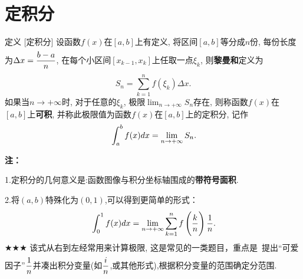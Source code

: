 \documentclass[a4paper,12pt,oneside,fontset=none]{ctexbook}
\let\olddfrac\dfrac
\renewcommand{\dfrac}[2]{
    \olddfrac{#1\vrule width 0pt height 1.15em depth 0em}{#2\vrule width 0pt height 0em depth 0.6em}
}
\let\oldlim\lim
\renewcommand{\lim}{\displaystyle\oldlim}
\let\oldint\int
\renewcommand{\int}{\displaystyle{\vrule width 0pt height 0em depth 0em}\oldint}
\let\oldsum\sum
\renewcommand{\sum}{\displaystyle\oldsum}
\newcounter{theorem}[chapter]
\newenvironment{theorem}[1][]{\begin{thmBox}{定理}{#1}}{\end{thmBox}}
\newcounter{definition}[chapter]
\newenvironment{definition}[1][]{\begin{defBox}{定义}{#1}}{\end{defBox}}
\newenvironment{note}{
    \par\vspace{0.5em}\noindent
    \textbf{\color{NoteColor} 注：}
}{
    \par\vspace{0.5em}
}
\numberwithin{equation}{chapter}
\begin{document}
\section{定积分}
\begin{definition}
    [定积分]
    设函数$f(x)$在$[a,b]$上有定义, 将区间$[a,b]$等分成$n$份, 每份长度为$\Delta x = \dfrac{b-a}{n}$, 在每个小区间$[x_{k-1}, x_k]$上任取一点$\xi_k$, 则\textbf{黎曼和}定义为
    \[
        S_n = \sum_{k=1}^n f(\xi_k) \Delta x.
    \]
    如果当$n \to +\infty$时, 对于任意的$\xi_k$, 极限$\lim_{n \to +\infty} S_n$存在, 则称函数$f(x)$在$[a,b]$上\textbf{可积}, 并称此极限值为函数$f(x)$在$[a,b]$上的定积分, 记作
    \[
        \int_a^b f(x) dx = \lim_{n \to +\infty} S_n.
    \]
\end{definition}
\begin{note}
    1.定积分的几何意义是:函数图像与积分坐标轴围成的\textbf{带符号面积}.

    2.将$(a,b)$特殊化为$(0,1)$,可以得到更简单的形式：
    \[
        \int_0^1 f(x)dx = \lim_{n \to +\infty} \sum_{k=1}^n f\left(\dfrac{k}{n}\right)\dfrac{1}{n} .
    \]
    $\bigstar\bigstar\bigstar$ 该式从右到左经常用来计算极限,
    这是常见的一类题目，重点是\ 提出“可爱因子”$\dfrac{1}{n}$并凑出积分变量(如$\dfrac{i}{n}$,或其他形式),根据积分变量的范围确定分范围.
    
\end{note}





    
\end{document}
